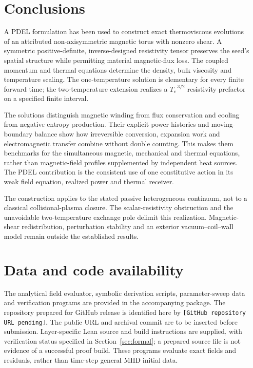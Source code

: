 \documentclass[11pt,a4paper]{article}
\theoremstyle{remark}\newtheorem{remark}{Remark}
\numberwithin{equation}{section}
\newcommand{\repositoryplaceholder}{\texttt{[GitHub repository URL pending]}}
\begin{document}

\section{Conclusions}\label{sec:discussion}
A PDEL formulation has been used to construct exact thermoviscous evolutions of an attributed non-axisymmetric magnetic torus with nonzero shear. A symmetric positive-definite, inverse-designed resistivity tensor preserves the seed's spatial structure while permitting material magnetic-flux loss. The coupled momentum and thermal equations determine the density, bulk viscosity and temperature scaling. The one-temperature solution is elementary for every finite forward time; the two-temperature extension realizes a $T_e^{-3/2}$ resistivity prefactor on a specified finite interval.

The solutions distinguish magnetic winding from flux conservation and cooling from negative entropy production. Their explicit power histories and moving-boundary balance show how irreversible conversion, expansion work and electromagnetic transfer combine without double counting. This makes them benchmarks for the simultaneous magnetic, mechanical and thermal equations, rather than magnetic-field profiles supplemented by independent heat sources. The PDEL contribution is the consistent use of one constitutive action in its weak field equation, realized power and thermal receiver.

The construction applies to the stated passive heterogeneous continuum, not to a classical collisional-plasma closure. The scalar-resistivity obstruction and the unavoidable two-temperature exchange pole delimit this realization. Magnetic-shear redistribution, perturbation stability and an exterior vacuum--coil--wall model remain outside the established results.


\section*{Data and code availability}
The analytical field evaluator, symbolic derivation scripts, parameter-sweep data and verification programs are provided in the accompanying package. The repository prepared for GitHub release is identified here by \repositoryplaceholder. The public URL and archival commit are to be inserted before submission. Layer-specific Lean source and build instructions are supplied, with verification status specified in Section~\ref{sec:formal}; a prepared source file is not evidence of a successful proof build. These programs evaluate exact fields and residuals, rather than time-step general MHD initial data.
\appendix
\end{document}
